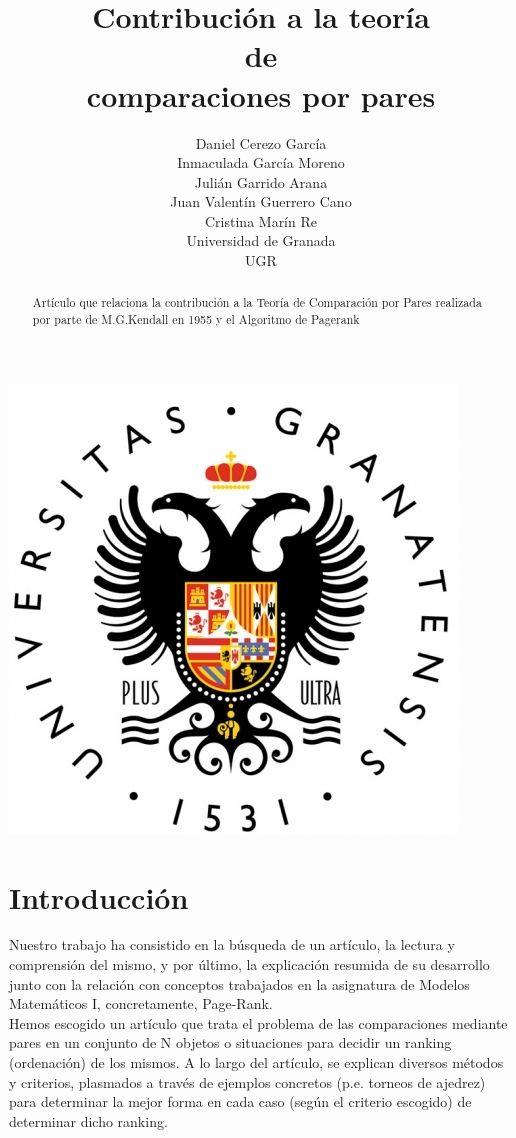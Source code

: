 \documentclass[a4paper]{article}
\title{Contribución a la teoría \\ de \\ comparaciones por pares }
\author{Daniel Cerezo García\\ Inmaculada García Moreno \\ Julián Garrido Arana \\ Juan Valentín Guerrero Cano \\ Cristina Marín Re \\
	
  \small Universidad de Granada \\ UGR
  
  \date{}
}
\begin{document}
\maketitle
\begin{center}
\includegraphics{ugr}\\
\end{center}

\begin{abstract}
Artículo que relaciona la contribución a la Teoría de Comparación por Pares realizada por parte de M.G.Kendall en 1955 y el Algoritmo de Pagerank
\end{abstract}

\section{Introducción}
	Nuestro trabajo ha consistido en la búsqueda de un artículo, la lectura y comprensión del mismo, y por último, la explicación resumida de su desarrollo junto con la relación con conceptos trabajados en la asignatura de Modelos Matemáticos I, concretamente, Page-Rank.\\
	

	Hemos escogido un artículo que trata el problema de las comparaciones mediante pares en un conjunto de N objetos o situaciones para decidir un ranking (ordenación) de los mismos. A lo largo del artículo, se explican diversos métodos y criterios, plasmados a través de ejemplos concretos (p.e. torneos de ajedrez) para determinar la mejor forma en cada caso (según el criterio escogido) de determinar dicho ranking.\\
	
\end{document}
